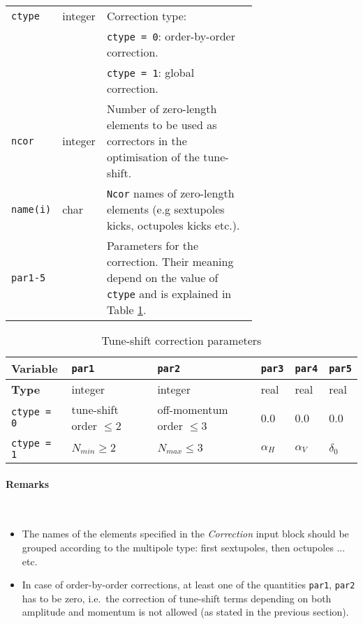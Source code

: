 \bigskip
\begin{longtabu}{@{}llp{0.7\linewidth}}
    \texttt{ctype}   & integer & Correction type: \\
                     &         & \texttt{ctype = 0}: order-by-order correction. \\
                     &         & \texttt{ctype = 1}: global correction. \\
    \texttt{ncor}    & integer & Number of zero-length elements to be used as correctors in the optimisation of the tune-shift. \\
    \texttt{name(i)} & char    & \texttt{Ncor} names of zero-length elements (e.g sextupoles kicks, octupoles kicks etc.). \\
    \texttt{par1-5}  &         & Parameters for the correction. Their meaning depend on the value of \texttt{ctype} and is  explained in Table \ref{tab:CORR}. \\
\end{longtabu}

\begin{table}[h]
\begin{center}
    \caption{Tune-shift correction parameters}
    \label{tab:CORR}
    \begin{tabular}{|l|p{2cm}|p{2.6cm}|p{1.8cm}|p{1.8cm}|p{1.8cm}|}
    \hline
    \rowcolor{blue!30}
    \textbf{Variable} & \texttt{par1} & \texttt{par2} & \texttt{par3} & \texttt{par4} & \texttt{par5} \\
    \hline
    
    \rowcolor{blue!15}
    \textbf{Type} & integer & integer & real & real & real \\
    \hline
    
    \texttt{ctype = 0} & tune-shift order $\leq 2$ & off-momentum order $\leq 3$ & 0.0 & 0.0 & 0.0 \\
    \hline
    
    \texttt{ctype = 1} & $N_{min}\geq 2$ & $N_{max}\leq 3$ & $\alpha_H$ & $\alpha_V$ & $\delta_0 $ \\
    \hline
    \end{tabular}
\end{center}
\end{table}

\paragraph{Remarks}~
\begin{itemize}
    \item The names of the elements specified in the \textit{Correction} input block should be grouped according to the multipole type: first sextupoles, then octupoles $\ldots$ etc.
    \item In case of order-by-order corrections, at least one of the quantities \texttt{par1}, \texttt{par2} has to be zero, i.e.\ the correction of tune-shift terms depending on both amplitude and momentum is not allowed (as stated in the previous section).
\end{itemize}

